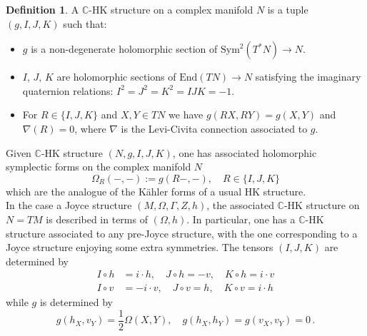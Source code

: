 \documentclass{article}
\theoremstyle{definition}
\newtheorem{definition}[theorem]{Definition}
\numberwithin{equation}{section}
\begin{document}
\begin{definition}
    A $\mathbb{C}$-HK structure on a complex manifold $N$ is a tuple $(g,I,J,K)$ such that:
    \begin{itemize}
        \item $g$ is a non-degenerate holomorphic section of $\text{Sym}^2(T^*N)\to N$.
        \item $I$, $J$, $K$ are holomorphic sections of $\text{End}(TN)\to N$ satisfying the imaginary quaternion relations: $I^2=J^2=K^2=IJK=-1$.
        \item For $R\in \{I,J,K\}$ and $X,Y\in TN$ we have $g(RX,RY)=g(X,Y)$ and $\nabla(R)=0$, where $\nabla$ is the Levi-Civita connection associated to $g$.
    \end{itemize}
\end{definition}
Given $\mathbb{C}$-HK structure $(N,g,I,J,K)$, one has associated holomorphic symplectic forms on the complex manifold $N$
\begin{equation*}
    \Omega_R(-,-):=g(R-,-), \quad R\in \{I,J,K\}
\end{equation*}
which are the analogue of the K\"{a}hler forms of a usual HK structure. \\

In the case a Joyce structure $(M,\Omega,\Gamma,Z,h)$, the associated $\mathbb{C}$-HK structure on $N=TM$ is described in terms of $(\Omega,h)$. In particular, one has a $\mathbb{C}$-HK structure associated to any pre-Joyce structure, with the one corresponding to a Joyce structure enjoying some extra symmetries. The tensors $(I,J,K)$ are determined by 
\begin{equation*}
\begin{split}
    I\circ h &= i\cdot h, \quad J\circ h= -v, \quad K\circ h = i\cdot v\\
    I\circ v &= -i\cdot v, \quad J\circ v = h, \quad K\circ v = i\cdot h
\end{split}
\end{equation*}
while $g$ is determined by 
\begin{equation*}
g(h_X,v_Y)=\frac{1}{2}\Omega(X,Y), \quad g(h_X,h_Y)=g(v_X,v_Y)=0\,.
\end{equation*}
\end{document}
